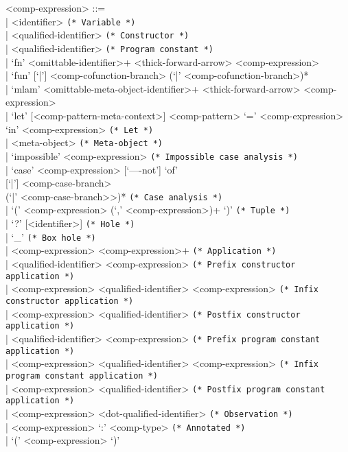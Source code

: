\documentclass[11pt]{article}
\begin{document}
\begin{grammar}
<comp-expression> ::= \hfill\\
| <identifier> \hfill \texttt{(* Variable *)}\\
| <qualified-identifier> \hfill \texttt{(* Constructor *)}\\
| <qualified-identifier> \hfill \texttt{(* Program constant *)}\\
| `fn' <omittable-identifier>+ <thick-forward-arrow> <comp-expression>\\
| `fun' [`|'] <comp-cofunction-branch> (`|' <comp-cofunction-branch>)*\\
| `mlam' <omittable-meta-object-identifier>+ <thick-forward-arrow> <comp-expression>\\
| `let' [<comp-pattern-meta-context>] <comp-pattern> `=' <comp-expression> \\
  `in' <comp-expression> \hfill \texttt{(* Let *)}\\
| <meta-object> \hfill \texttt{(* Meta-object *)}\\
| `impossible' <comp-expression> \hfill \texttt{(* Impossible case analysis *)} \\
| `case' <comp-expression> [`----not'] `of'\\{}
  [`|'] <comp-case-branch>\\
  (`|' <comp-case-branch>>)* \hfill \texttt{(* Case analysis *)}\\
| `(' <comp-expression> (`,' <comp-expression>)+ `)' \hfill \texttt{(* Tuple *)}\\
| `?' [<identifier>] \hfill \texttt{(* Hole *)}\\
| `_' \hfill \texttt{(* Box hole *)}\\
| <comp-expression> <comp-expression>+ \hfill \texttt{(* Application *)}\\
| <qualified-identifier> <comp-expression> \hfill \texttt{(* Prefix constructor application *)}\\
| <comp-expression> <qualified-identifier> <comp-expression> \hfill \texttt{(* Infix constructor application *)}\\
| <comp-expression> <qualified-identifier> \hfill \texttt{(* Postfix constructor application *)}\\
| <qualified-identifier> <comp-expression> \hfill \texttt{(* Prefix program constant application *)}\\
| <comp-expression> <qualified-identifier> <comp-expression> \hfill \texttt{(* Infix program constant application *)}\\
| <comp-expression> <qualified-identifier> \hfill \texttt{(* Postfix program constant application *)}\\
| <comp-expression> <dot-qualified-identifier> \hfill \texttt{(* Observation *)}\\
| <comp-expression> `:' <comp-type> \hfill \texttt{(* Annotated *)}\\
| `(' <comp-expression> `)'


\end{grammar}
\end{document}
